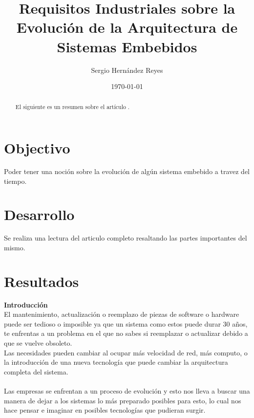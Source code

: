 \documentclass{article}
\title{Requisitos Industriales sobre la Evolución de la Arquitectura de Sistemas Embebidos} %
\author{Sergio Hernández Reyes} %
\date{\today} %
\begin{document}
\maketitle %



\renewcommand{\abstractname}{Abstracto}
\begin{abstract}
El siguiente es un resumen sobre el artículo \cite{ieee}.
\end{abstract}

\section{Objectivo}
Poder tener una noción sobre la evolución de algún sistema embebido a travez del tiempo.



\section{Desarrollo}
Se realiza una lectura del articulo completo resaltando las partes importantes del mismo.


\section{Resultados}
{\bf Introducción}\\
El mantenimiento, actualización o reemplazo de piezas de software o hardware puede ser tedioso o imposible ya que un sistema como estos puede durar 30 años, te enfrentas a un problema en el que no sabes si reemplazar o actualizar debido a que se vuelve obsoleto.\\

Las necesidades pueden cambiar al ocupar más velocidad de red, más computo, o la introducción de una nueva tecnología que puede cambiar la arquitectura completa del sistema.\\
\\Las empresas se enfrentan a un proceso de evolución y esto nos lleva a buscar una manera de dejar a los sistemas lo más preparado posibles para esto, lo cual nos hace pensar e imaginar en posibles tecnologías que pudieran surgir.\\
\end{document}
